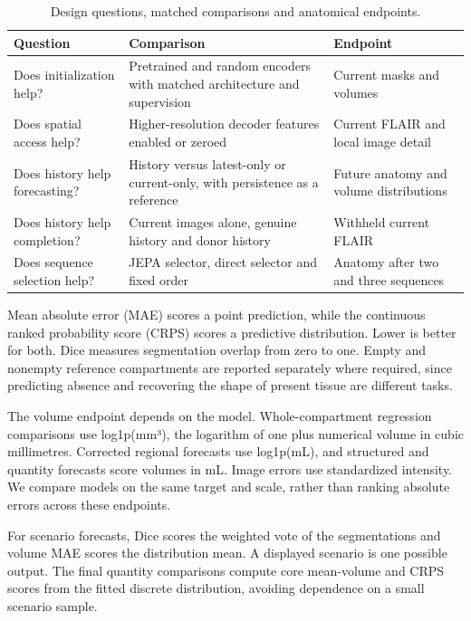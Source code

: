 \begin{table}[!htbp]\centering
\singlespacing\small\setlength{\tabcolsep}{4pt}\renewcommand{\arraystretch}{1.2}
\caption[Design questions and matched comparisons]{Design questions, matched comparisons and anatomical endpoints.}\label{tab:4.1}
\begin{tabular}{>{\raggedright\arraybackslash}p{}>{\raggedright\arraybackslash}p{}>{\raggedright\arraybackslash}p{}}
\toprule \textbf{Question} & \textbf{Comparison} & \textbf{Endpoint} \\\midrule
Does initialization help? & Pretrained and random encoders with matched architecture and supervision & Current masks and volumes \\
Does spatial access help? & Higher-resolution decoder features enabled or zeroed & Current FLAIR and local image detail \\
Does history help forecasting? & History versus latest-only or current-only, with persistence as a reference & Future anatomy and volume distributions \\
Does history help completion? & Current images alone, genuine history and donor history & Withheld current FLAIR \\
Does sequence selection help? & JEPA selector, direct selector and fixed order & Anatomy after two and three sequences \\
\bottomrule
\end{tabular}
\end{table}

Mean absolute error (MAE) scores a point prediction, while the continuous ranked probability score (CRPS) scores a predictive distribution. Lower is better for both. Dice measures segmentation overlap from zero to one. Empty and nonempty reference compartments are reported separately where required, since predicting absence and recovering the shape of present tissue are different tasks.

The volume endpoint depends on the model. Whole-compartment regression comparisons use log1p(mm³), the logarithm of one plus numerical volume in cubic millimetres. Corrected regional forecasts use log1p(mL), and structured and quantity forecasts score volumes in mL. Image errors use standardized intensity. We compare models on the same target and scale, rather than ranking absolute errors across these endpoints.

For scenario forecasts, Dice scores the weighted vote of the segmentations and volume MAE scores the distribution mean. A displayed scenario is one possible output. The final quantity comparisons compute core mean-volume and CRPS scores from the fitted discrete distribution, avoiding dependence on a small scenario sample.

